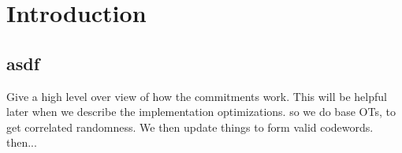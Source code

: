 \section{Introduction}


\subsection{asdf}

Give a high level over view of how the commitments work. This will be helpful later when we describe the implementation optimizations. so we do base OTs, to get correlated randomness. We then update things to form valid codewords. then...